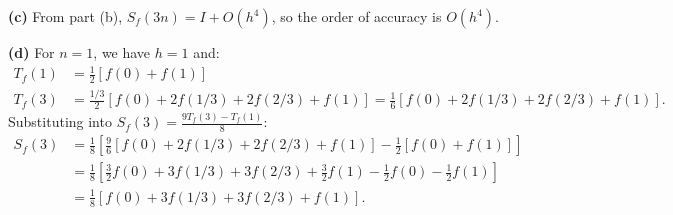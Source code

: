 \documentclass[reqno]{exam}
\begin{document}
\begin{questions}
\begin{solution}
\textbf{(c)} From part (b), $S_f(3n) = I + O(h^4)$, so the order of accuracy is $O(h^4)$.

\textbf{(d)} For $n = 1$, we have $h = 1$ and:
\begin{align*}
T_f(1) &= \frac{1}{2}[f(0) + f(1)]\\
T_f(3) &= \frac{1/3}{2}[f(0) + 2f(1/3) + 2f(2/3) + f(1)] = \frac{1}{6}[f(0) + 2f(1/3) + 2f(2/3) + f(1)].
\end{align*}
Substituting into $S_f(3) = \frac{9T_f(3) - T_f(1)}{8}$:
\begin{align*}
S_f(3) &= \frac{1}{8}\left[\frac{9}{6}[f(0) + 2f(1/3) + 2f(2/3) + f(1)] - \frac{1}{2}[f(0) + f(1)]\right]\\
&= \frac{1}{8}\left[\frac{3}{2}f(0) + 3f(1/3) + 3f(2/3) + \frac{3}{2}f(1) - \frac{1}{2}f(0) - \frac{1}{2}f(1)\right]\\
&= \frac{1}{8}[f(0) + 3f(1/3) + 3f(2/3) + f(1)].
\end{align*}
\end{solution}





\end{questions}
\end{document}
